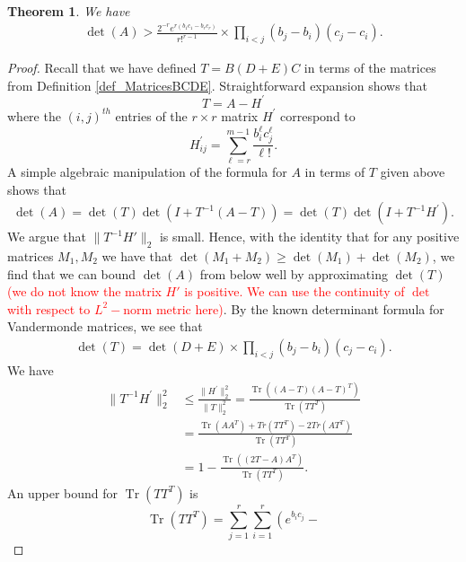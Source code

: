 \documentclass[12pt]{amsart}
\newtheorem{theorem}{Theorem}[section]
\theoremstyle{definition}
\theoremstyle{remark}
\numberwithin{equation}{section}
\DeclareMathOperator{\Tr}{Tr}
\begin{document}
\begin{theorem}
We have
\begin{align*}
\det(A) > \frac{2^{-r}e^{r(b_1c_1-b_rc_r)}}{r!^{r-1}} \times \prod_{i< j} (b_j-b_i)(c_j-c_i).  
\end{align*}
\end{theorem}
\noindent 
\begin{proof}
Recall that we have defined $T = B(D+E)C$ in terms of the 
matrices from Definition \ref{def_MatricesBCDE}.
Straightforward expansion shows that
$$T = A - H^{\prime}$$
where the $(i,j)^{th}$ entries of the $r \times r$ matrix $H^{\prime}$ correspond to 
$$H^{\prime}_{ij} = \sum_{\ell= r}^{m-1} \frac{b_i^{\ell}c_j^{\ell}}{\ell!}.$$
A simple algebraic manipulation of the formula for $A$ in terms of $T$ given above shows that 
\begin{align}
\label{deta}
\det(A) = \det(T) \det(I+ T^{-1}(A-T)) = \det(T)\det\left(I+ T^{-1}H^{\prime}\right). 
\end{align}
We argue that $\parallel T^{-1}H'\parallel_2$ is small. 
Hence, with the identity that for any positive matrices $M_1,M_2$ we have that 
$\det(M_1+M_2) \geq \det(M_1) + \det(M_2)$, we find 
that we can bound $\det(A)$ from below well by approximating $\det(T)$ \textcolor{red}{(we do not know the matrix $H'$ is positive. We can use the continuity of $\det$ with respect to $L^2-$norm metric here)}. 
By the known determinant formula for Vandermonde matrices, we see that 
\begin{align}
\label{dett}
\det(T) = \det(D+E) \times\prod_{i< j} (b_j-b_i)(c_j-c_i). 
\end{align}
We have
\begin{align*}
\parallel T^{-1}H^{\prime}\parallel_2^2&\leq \frac{\parallel H^{\prime}\parallel_2^2}{\parallel T\parallel_2^2} = 
     \frac{\Tr\left((A-T)(A-T)^T\right)}{\Tr(TT^T)}\nonumber\\
& = \frac{\Tr(AA^T)+Tr(TT^T)-2Tr(AT^T)}{\Tr(TT^T)} \nonumber\\
& =  1-\frac{\Tr\left((2T-A)A^T\right)}{\Tr(TT^T)}.
\end{align*}
An upper bound for $\Tr(TT^T)$ is
\[
\Tr(TT^T) = \sum_{j=1}^r\sum_{i=1}^r\left(e^{b_ic_j} - 
\]
\end{proof}
\end{document}

